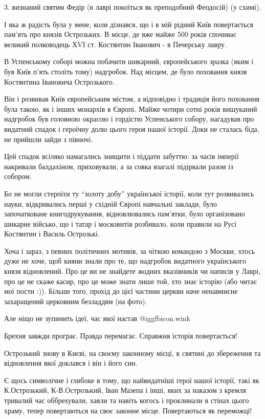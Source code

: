 3. визнаний святим Федір (в лаврі покоїться як преподобний Феодосій) (у схимі).

І яка ж радість була у мене, коли дізнався, що і в мій рідний Київ повертається
пам’ять про князів Острозьких. В місце, де вже майже 500 років спочиває великий
полководець ХVI ст. Костянтин Іванович - в Печерську лавру.


В Успенському соборі можна побачити шикарний, європейського зразка (яким і був
Київ п’ять століть тому) надгробок. Над місцем, де було поховання князя
Костянтина Івановича Острозького. 

Він і розвивав Київ європейським містом, а відповідно і традиція його поховання
була такою, як і інших монархів в Європі. Майже чотири сотні років вишуканий
надгробок був головною окрасою і гордістю Успенського собору, нагадував про
видатний спадок і героїчну долю цього героя нашої історії. Доки не сталась
біда, не прийшли зайди з півночі.

Цей спадок всіляко намагались знищити і піддати забуттю: за часів імперії
накривали балдахіном, приховували, а за совка взагалі підірвали разом із
собором. 

Бо не могли стерпіти ту \enquote{золоту добу} української історії, коли тут
розвивались науки, відкривались перші у східній Європі навчальні заклади, було
започатковане книгодрукування, відновлювались пам’ятки, було організовано
шикарне військо, що і татар і московитів розбивало, коли правили на Русі
Костянтин і Василь Острозькі.  

Хоча і зараз, з певних політичних мотивів, за чіткою командою з Москви, хтось
дуже не хоче, щоб кияни знали про те, що надгробок видатного українського князя
відновлений. Про це ви не знайдете жодних вказівників чи написів у Лаврі, про
це не скаже касир, про це може знати лише той, хто знає історію (або читає мої
пости :)). Більше того, прохід до цієї частини церкви наче ненавмисне
захаращений церковним безладдям (на фото). 

Але ніщо не зупинить ідеї, час якої настав  @igg{fbicon.wink}  

Брехня завжди програє. Правда перемагає. Справжня історія повертається!

Острозький знову в Києві, на своєму законному місці, в святині до збереження та
відновлення якої доклався і він і його син. 

Є щось символічне і глибоке в тому, що найвидатніші герої нашої історії, такі
як К.Острозький, К-В.Острозький, Іван Мазепа і інші, яких за наказом з кремля
тривалий час оббрехували, хаяли та навіть когось і проклинали в стінах цього
храму, тепер повертаються на своє законне місце. Повертаються як переможці!

